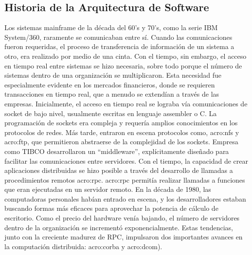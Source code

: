 \subsection{Historia de la Arquitectura de Software}
\label{historia}

Los sistemas mainframe de la década del 60’s y 70’s, como la serie IBM System/360, raramente se comunicaban entre sí.  Cuando las comunicaciones fueron requeridas, el proceso de transferencia de información de un sistema a otro, era realizado por medio de una cinta.  Con el tiempo, sin embargo, el acceso en tiempo real entre sistemas se hizo necesaria, sobre todo porque el número de sistemas dentro de una organización se multiplicaron. Esta necesidad fue especialmente evidente en los mercados financieros, donde se requieren transacciones en tiempo real, que a menudo se extendían a través de las empresas.
Inicialmente, el acceso en tiempo real se lograba vía comunicaciones de socket de bajo nivel, usualmente escritas en lenguaje assembler o C.  La programación de sockets era compleja y requería amplios conocimientos en los protocolos de redes.  Más tarde, entraron en escena protocolos como, \gls{acro:nfs} y \gls{acro:ftp}, que permitieron abstraerse de la complejidad de los sockets.
Empresa como TIBCO desarrollaron un “middleware”, explícitamente diseñado para facilitar las comunicaciones entre servidores.  Con el tiempo, la capacidad de crear aplicaciones distribuidas se hizo posible a través del desarrollo de llamadas a procedimientos remotos \gls{acro:rpc}. \gls{acro:rpc} permitía realizar llamadas a funciones que eran ejecutadas en un servidor remoto.
En la década de 1980, las computadoras personales habían entrado en escena, y los desarrolladores estaban buscando formas más eficaces para aprovechar la potencia de cálculo de escritorio. Como el precio del hardware venía bajando, el número de servidores dentro de la organización se incrementó exponencialmente. Estas tendencias, junto con la creciente madurez de RPC, impulsaron dos importantes avances en la computación distribuida: \gls{acro:corba} y \gls{acro:dcom}).

